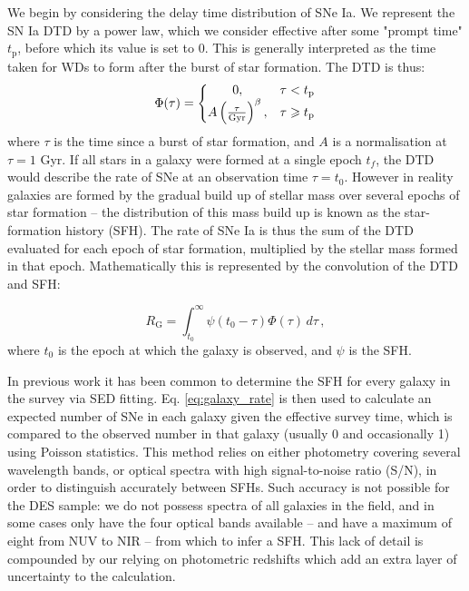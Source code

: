 \documentclass[fleqn,usenatbib]{mnras}
\begin{document}
We begin by considering the delay time distribution of SNe Ia.
We represent the SN Ia DTD by a power law, which we consider effective after some "prompt time" $t_{\mathrm{p}}$, before which its value is set to 0. This is generally interpreted as the time taken for WDs to form after the burst of star formation. The DTD is thus:
\begin{equation}
 \Phi(\tau) = \left\{
    \begin{array}{@{}cc@{}}
    0 , & \tau < t_{\mathrm{p}} \\
    A\left(\frac{\tau}{\mathrm{Gyr}}\right)^{\beta} , & \tau \geq t_{\mathrm{p}}
    \end{array}\right.
        \label{eq:dtd}
\end{equation} 
where $\tau$ is the time since a burst of star formation, and $A$ is a normalisation at $\tau=1$ Gyr. If all stars in a galaxy were formed at a single epoch $t_f$, the DTD would describe the rate of SNe at an observation time $\tau = t_0$. However in reality galaxies are formed by the gradual build up of stellar mass over several epochs of star formation -- the distribution of this mass build up is known as the star-formation history (SFH). The rate of SNe Ia is thus the sum of the DTD evaluated for each epoch of star formation, multiplied by the stellar mass formed in that epoch. Mathematically this is represented by the convolution of the DTD and SFH:
 
\begin{equation}
    R_{\mathrm{G}} = \int_{t_0}^{\infty} \psi(t_0-\tau)\Phi(\tau)\,d\tau \,,
    \label{eq:galaxy_rate}
\end{equation}
where $t_0$ is the epoch at which the galaxy is observed, and $\psi$ is the SFH. 

In previous work \citep[e.g.][]{Strolger2004,Maoz2012} it has been common to determine the SFH for every galaxy in the survey via SED fitting. Eq. \ref{eq:galaxy_rate} is then used to calculate an expected number of SNe in each galaxy given the effective survey time, which is compared to the observed number in that galaxy (usually 0 and occasionally 1) using Poisson statistics. This method relies on either photometry covering several wavelength bands, or optical spectra with high signal-to-noise ratio (S/N), in order to distinguish accurately between SFHs. Such accuracy is not possible for the DES sample: we do not possess spectra of all galaxies in the field, and in some cases only have the four optical bands available -- and have a maximum of eight from NUV to NIR -- from which to infer a SFH. This lack of detail is compounded by our relying on photometric redshifts which add an extra layer of uncertainty to the calculation. 
\end{document}
